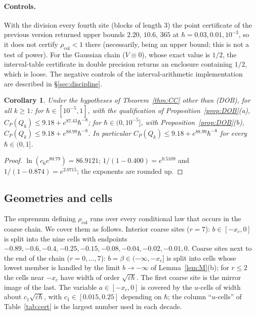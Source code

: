 \documentclass[11pt,a4paper]{article}
\newtheorem{corollary}[theorem]{Corollary}
\theoremstyle{definition}
\theoremstyle{remark}
\newcommand{\xc}{x_c}
\newcommand{\rcol}{\rho_{\mathrm{col}}}
\begin{document}
\paragraph{Controls.} With the division every fourth site (blocks of length $3$) the point certificate of the previous version returned upper bounds $2.20$, $10.6$, $365$ at $\hbar=0.03,0.01,10^{-3}$, so it does not certify $\rcol<1$ there (necessarily, being an upper bound; this is not a test of power). For the Gaussian chain ($V\equiv0$), whose exact value is $1/2$, the interval-table certificate in double precision returns an enclosure containing $1/2$, which is loose. The negative controls of the interval-arithmetic implementation are described in \S\ref{sec:discipline}.

\begin{corollary}\label{cor:points}
Under the hypotheses of Theorem~\ref{thm:CC} other than \textup{(DOB)}, for all $k\ge1$: for $\hbar\in[10^{-5},1]$, with the qualification of Proposition~\ref{prop:DOB}\textup{(a)}, $C_P(Q_k)\le9.18+e^{87.43}\hbar^{-8}$; for $\hbar\in(0,10^{-5}]$, with Proposition~\ref{prop:DOB}\textup{(b)}, $C_P(Q_k)\le9.18+e^{88.99}\hbar^{-8}$. In particular $C_P(Q_k)\le9.18+e^{88.99}\hbar^{-8}$ for every $\hbar\in(0,1]$.
\end{corollary}
\begin{proof}
$\ln(c_6e^{80.79})=86.9121$; $1/(1-0.400)=e^{0.5109}$ and $1/(1-0.874)=e^{2.0715}$; the exponents are rounded up.
\end{proof}

\subsection{Geometries and cells}\label{sec:cells}
The supremum defining $\rcol$ runs over every conditional law that occurs in the coarse chain. We cover them as follows. Interior coarse sites ($r=7$): $b\in[-\xc,0]$ is split into the nine cells with endpoints $-0.89,-0.6,-0.4,-0.25,-0.15,-0.08,-0.04,-0.02,-0.01,0$. Coarse sites next to the end of the chain ($r=0,\dots,7$): $b=\beta\in(-\infty,-\xc]$ is split into cells whose lowest member is handled by the limit $b\to-\infty$ of Lemma~\ref{lem:M}(b); for $r\le2$ the cells near $-\xc$ have width of order $\sqrt{\varepsilon\hbar}$. The first coarse site is the mirror image of the last. The variable $a\in[-\xc,0]$ is covered by the $u$-cells of width about $c_1\sqrt{\varepsilon\hbar}$, with $c_1\in[0.015,0.25]$ depending on $\hbar$; the column ``$u$-cells'' of Table~\ref{tab:cert} is the largest number used in each decade.
\end{document}
